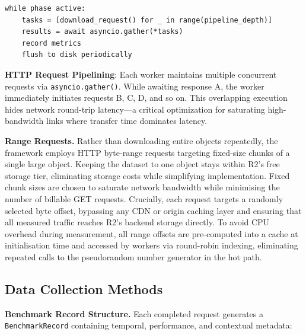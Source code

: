 \begin{verbatim}
while phase active:
    tasks = [download_request() for _ in range(pipeline_depth)]
    results = await asyncio.gather(*tasks)
    record metrics
    flush to disk periodically
\end{verbatim}

\textbf{HTTP Request Pipelining}: Each worker maintains multiple concurrent requests via \texttt{asyncio.gather()}. While awaiting response A, the worker immediately initiates requests B, C, D, and so on. This overlapping execution hides network round-trip latency—a critical optimization for saturating high-bandwidth links where transfer time dominates latency.

\textbf{Range Requests.} Rather than downloading entire objects repeatedly, the framework employs HTTP byte-range requests targeting fixed-size chunks of a single large object. Keeping the dataset to one object stays within R2's free storage tier, eliminating storage costs while simplifying implementation. Fixed chunk sizes are chosen to saturate network bandwidth while minimising the number of billable GET requests. Crucially, each request targets a randomly selected byte offset, bypassing any CDN or origin caching layer and ensuring that all measured traffic reaches R2's backend storage directly. To avoid CPU overhead during measurement, all range offsets are pre-computed into a cache at initialisation time and accessed by workers via round-robin indexing, eliminating repeated calls to the pseudorandom number generator in the hot path.


\subsection{Data Collection Methods}\label{sec:data-collection}

\textbf{Benchmark Record Structure.} Each completed request generates a \texttt{BenchmarkRecord} containing temporal, performance, and contextual metadata:

